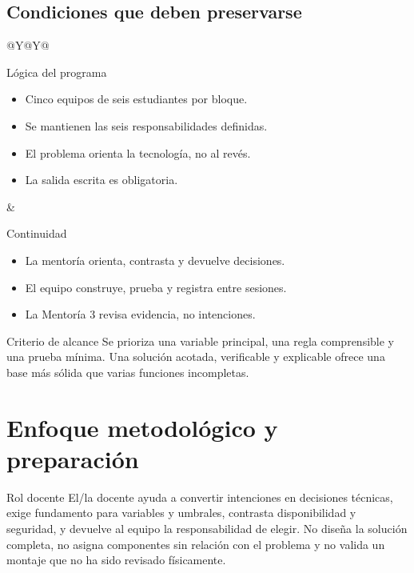 \documentclass[10pt,a4paper]{article}
\begin{document}
\subsection{Condiciones que deben preservarse}
\begin{tabularx}{\textwidth}{@{}Y@{\hspace{4mm}}Y@{}}
\begin{docbox}[height=53mm]{Lógica del programa}
\begin{itemize}
  \item Cinco equipos de seis estudiantes por bloque.
  \item Se mantienen las seis responsabilidades definidas.
  \item El problema orienta la tecnología, no al revés.
  \item La salida escrita es obligatoria.
\end{itemize}
\end{docbox}
&
\begin{docbox}[height=53mm]{Continuidad}
\begin{itemize}
  \item La mentoría orienta, contrasta y devuelve decisiones.
  \item El equipo construye, prueba y registra entre sesiones.
  \item La Mentoría 3 revisa evidencia, no intenciones.
\end{itemize}
\end{docbox}
\end{tabularx}

\begin{accentbox}{Criterio de alcance}
Se prioriza una variable principal, una regla comprensible y una prueba mínima. Una solución acotada, verificable y explicable ofrece una base más sólida que varias funciones incompletas.
\end{accentbox}

\newpage
\section{Enfoque metodológico y preparación}

\begin{navybox}{Rol docente}
El/la docente ayuda a convertir intenciones en decisiones técnicas, exige fundamento para variables y umbrales, contrasta disponibilidad y seguridad, y devuelve al equipo la responsabilidad de elegir. No diseña la solución completa, no asigna componentes sin relación con el problema y no valida un montaje que no ha sido revisado físicamente.
\end{navybox}
\end{document}
